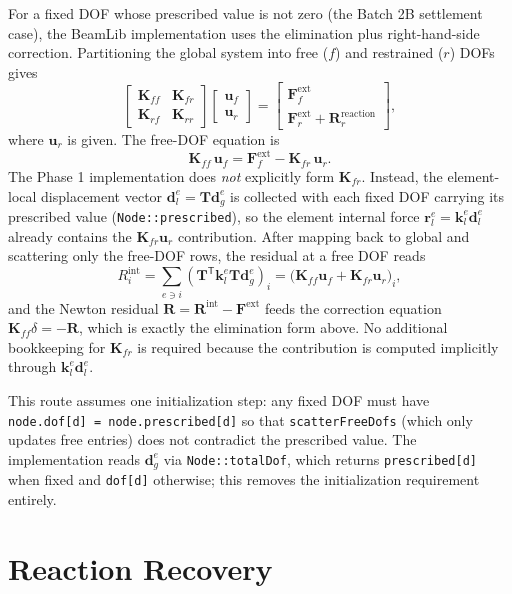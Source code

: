 \documentclass[11pt,a4paper]{article}
\newcommand{\bmath}[1]{\boldsymbol{#1}}
\begin{document}
For a fixed DOF whose prescribed value is not zero (the Batch 2B settlement case), the BeamLib implementation uses the elimination plus right-hand-side correction. Partitioning the global system into free ($f$) and restrained ($r$) DOFs gives
\[
\begin{bmatrix} \bmath{K}_{ff} & \bmath{K}_{fr} \\ \bmath{K}_{rf} & \bmath{K}_{rr} \end{bmatrix}
\begin{bmatrix} \bmath{u}_f \\ \bmath{u}_r \end{bmatrix}
=
\begin{bmatrix} \bmath{F}_f^{\mathrm{ext}} \\ \bmath{F}_r^{\mathrm{ext}} + \bmath{R}_r^{\mathrm{reaction}} \end{bmatrix},
\]
where $\bmath{u}_r$ is given. The free-DOF equation is
\[
\bmath{K}_{ff}\,\bmath{u}_f = \bmath{F}_f^{\mathrm{ext}} - \bmath{K}_{fr}\,\bmath{u}_r.
\]
The Phase 1 implementation does \emph{not} explicitly form $\bmath{K}_{fr}$. Instead, the element-local displacement vector $\bmath{d}_l^e = \bmath{T}\bmath{d}_g^e$ is collected with each fixed DOF carrying its prescribed value (\texttt{Node::prescribed}), so the element internal force $\bmath{r}_l^e = \bmath{k}_l^e\bmath{d}_l^e$ already contains the $\bmath{K}_{fr}\bmath{u}_r$ contribution. After mapping back to global and scattering only the free-DOF rows, the residual at a free DOF reads
\[
R_i^{\mathrm{int}} = \sum_{e \ni i} (\bmath{T}^\mathsf{T}\bmath{k}_l^e\bmath{T}\bmath{d}_g^e)_i
                   = \bigl(\bmath{K}_{ff}\bmath{u}_f + \bmath{K}_{fr}\bmath{u}_r\bigr)_i,
\]
and the Newton residual $\bmath{R} = \bmath{R}^{\mathrm{int}} - \bmath{F}^{\mathrm{ext}}$ feeds the correction equation $\bmath{K}_{ff}\delta = -\bmath{R}$, which is exactly the elimination form above. No additional bookkeeping for $\bmath{K}_{fr}$ is required because the contribution is computed implicitly through $\bmath{k}_l^e\bmath{d}_l^e$.

This route assumes one initialization step: any fixed DOF must have \texttt{node.dof[d] = node.prescribed[d]} so that \texttt{scatterFreeDofs} (which only updates free entries) does not contradict the prescribed value. The implementation reads $\bmath{d}_g^e$ via \texttt{Node::totalDof}, which returns \texttt{prescribed[d]} when fixed and \texttt{dof[d]} otherwise; this removes the initialization requirement entirely.

\section{Reaction Recovery}\label{sec:reactions}
\end{document}
